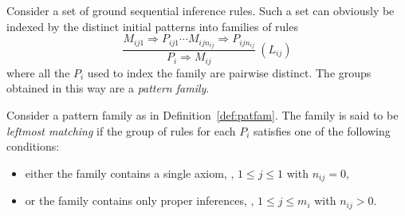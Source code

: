 \documentclass[letterpaper,11pt]{article}
\begin{document}
\begin{definition}\label{def:patfam}
  Consider a set of ground sequential inference rules.  Such a set can obviously be indexed by the
  distinct initial patterns into families of rules
  \begin{displaymath}
    \dfrac{ M_{ij1} ⇒ P_{ij1} \cdots M_{ijn_{ij}} ⇒ P_{ijn_{ij}} }{ P_i ⇒ M_{ij} } ~(L_{ij})
  \end{displaymath}
  where all the $P_i$ used to index the family are pairwise distinct.  The groups obtained in this
  way are a \emph{pattern family}.
\end{definition}

\begin{definition}
  Consider a pattern family as in Definition~\ref{def:patfam}.  The family is said to be
  \emph{leftmost matching} if the group of rules for each $P_i$ satisfies one of the following
  conditions:
  \begin{itemize}
  \item either the family contains a single axiom, \ie, $1≤j≤1$ with $n_{ij}=0$,
  \item or the family contains only proper inferences, \ie, $1≤j≤m_i$ with $n_{ij}>0$.
  \end{itemize}
\end{definition}

\end{document}
